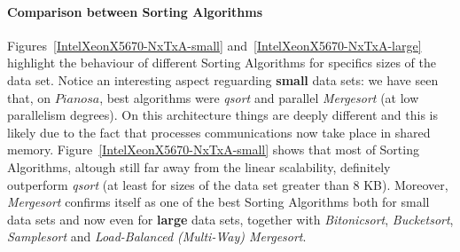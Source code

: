 \paragraph{Comparison between Sorting Algorithms} Figures~\ref{IntelXeonX5670-NxTxA-small} and~\ref{IntelXeonX5670-NxTxA-large} highlight the behaviour of different Sorting Algorithms for specifics sizes of the data set. Notice an interesting aspect reguarding \textbf{small} data sets: we have seen that, on $Pianosa$, best algorithms were \textit{qsort} and parallel \textit{Mergesort} (at low parallelism degrees). On this architecture things are deeply different and this is likely due to the fact that processes communications now take place in shared memory. Figure~\ref{IntelXeonX5670-NxTxA-small} shows that most of Sorting Algorithms, altough still far away from the linear scalability, definitely outperform \textit{qsort} (at least for sizes of the data set greater than 8 KB). Moreover, \textit{Mergesort} confirms itself as one of the best Sorting Algorithms both for small data sets and now even for \textbf{large} data sets, together with \textit{Bitonicsort}, \textit{Bucketsort}, \textit{Samplesort} and \textit{Load-Balanced (Multi-Way) Mergesort}.

